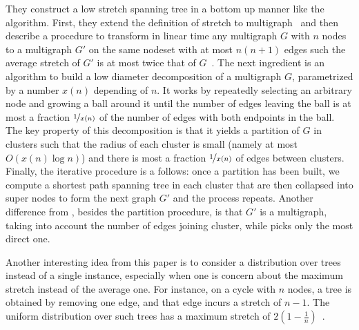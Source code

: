 They construct a low stretch spanning tree in a bottom up manner like the \gtx{} algorithm. First,
they extend the definition of stretch to multigraph~\autocite[Section 4]{LowerBound95} and then
describe a procedure to transform in linear time any multigraph $G$ with $n$ nodes to a multigraph
$G'$ on the same nodeset with at most $n(n+1)$ edges such the average stretch of $G'$ is at most
twice that of $G$~\autocite[Lemma 5.2]{LowerBound95}. The next ingredient is an algorithm to build a
low diameter decomposition of a multigraph $G$, parametrized by a number $x(n)$ depending of $n$. It
works by repeatedly selecting an arbitrary node and growing a ball around it until the number of
edges leaving the ball is at most a fraction $\nicefrac{1}{x(n)}$ of the number of edges with both
endpoints in the ball. The key property of this decomposition is that it yields a partition of $G$
in clusters such that the radius of each cluster is small (namely at most $O(x(n)\log n)$) and there
is most a fraction $\nicefrac{1}{x(n)}$ of edges between clusters. Finally, the iterative procedure
is a follows: once a partition has been built, we compute a shortest path spanning tree in each
cluster that are then collapsed into super nodes to form the next graph $G'$ and the process repeats.
Another difference from \gtx{}, besides the partition procedure, is that $G'$ is a multigraph,
taking into account the number of edges joining cluster, while \collapseStar{} picks only the most
direct one.

Another interesting idea from this paper is to consider a distribution over trees instead of a
single instance, especially when one is concern about the maximum stretch instead of the average
one. For instance, on a cycle with $n$ nodes, a tree is obtained by removing one edge, and that edge
incurs a stretch of $n-1$. The uniform distribution over such trees has a maximum stretch of
$2\left(1 - \frac{1}{n}\right)$~\autocite{circle2k89}.

